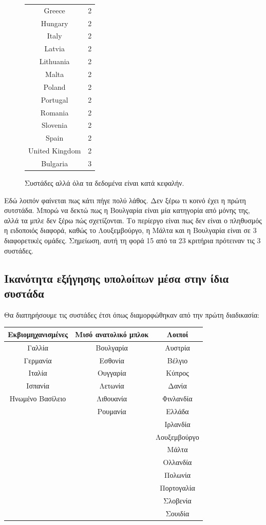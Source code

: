 \documentclass[a4paper,twoside,10pt]{article}
\begin{document}
\begin{figure}[!ht]
\begin{tabular}[b]{|cc|}
Greece &   2 \\
Hungary &   2 \\
Italy &   2 \\
Latvia &   2 \\
Lithuania &   2 \\
Malta &   2 \\
Poland &   2 \\
Portugal &   2 \\ 
Romania &   2 \\
Slovenia &   2 \\
Spain &   2 \\
United Kingdom &   2 \\ \hline
Bulgaria &   3 \\
\hline
	\end{tabular}
	\caption{Συστάδες αλλά όλα τα δεδομένα είναι κατά κεφαλήν.}
\end{figure}
Εδώ λοιπόν φαίνεται πως κάτι πήγε πολύ λάθος. Δεν ξέρω τι κοινό έχει η πρώτη συτστάδα. Μπορώ να δεκτώ πως η Bουλγαρία είναι μία κατηγορία από μόνης της, αλλά τα μπλε δεν ξέρω πώς σχετίζονται. Το περίεργο είναι πως δεν είναι ο πληθυσμός η ειδοποιός διαφορά, καθώς το Λουξεμβούργο, η Μάλτα και η Βουλγαρία είναι σε 3 διαφορετικές ομάδες.
Σημείωση, αυτή τη φορά 15 από τα 23 κριτήρια πρότειναν τις 3 συστάδες.

\subsection{Ικανότητα εξήγησης υπολοίπων μέσα στην ίδια συστάδα}

Θα διατηρήσουμε τις συστάδες έτσι όπως διαμορφώθηκαν από την πρώτη διαδικασία:
\begin{table}[H]
	\centering
	\begin{tabular}{|c|c|c|}
		\hline
		\cellcolor[rgb]{0.9,0.9,0.9} \bfseries{ Εκβιομηχανισμένες} & \cellcolor[rgb]{0.9,0.9,0.9} \bfseries{ Μισό ανατολικό μπλοκ} & \cellcolor[rgb]{0.9,0.9,0.9} \bfseries{ Λοιποί} \\
		\hline
		Γαλλία & Βουλγαρία & Αυστρία \\
		\hline
		Γερμανία & Εσθονία & Βέλγιο \\
		\hline
		Ιταλία & Ουγγαρία & Κύπρος \\
		\hline
		Ισπανία & Λετωνία & Δανία \\
		\hline
		Ηνωμένο Βασίλειο & Λιθουανία & Φινλανδία \\
		\hline
		& Ρουμανία & Ελλάδα \\
		\hline
		&  & Ιρλανδία \\
		\hline
		&  & Λουξεμβούργο \\
		\hline
		&  & Μάλτα \\
		\hline
		&  & Ολλανδία \\
		\hline
		&  & Πολωνία \\
		\hline
		&  & Πορτογαλία \\
		\hline
		&  & Σλοβενία \\
		\hline
		&  & Σουιδία \\
		\hline
	\end{tabular}
\end{table}
\end{document}
